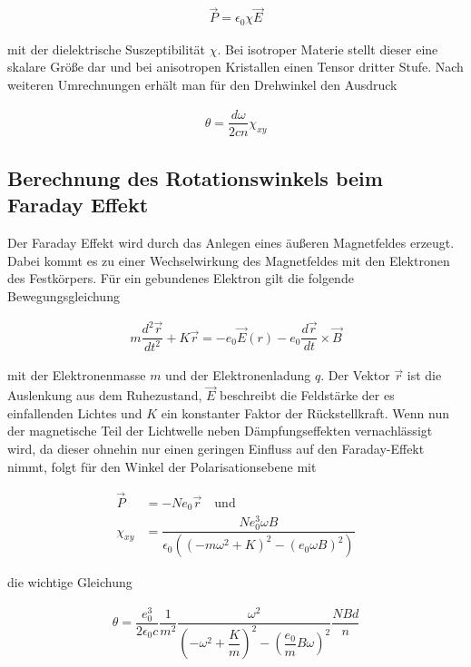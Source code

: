     \begin{align*}
    \vec{P}=\epsilon_0 \chi \vec{E}
    \end{align*}

     mit der dielektrische Suszeptibilität $\chi$. Bei isotroper Materie stellt dieser eine skalare Größe dar und bei anisotropen Kristallen
    einen Tensor dritter Stufe. Nach weiteren Umrechnungen erhält man für den Drehwinkel den Ausdruck

    \begin{align*}
    \theta= \dfrac{d\omega}{2cn}\chi_{xy}
    \end{align*}

    \newpage

    \subsection{Berechnung des Rotationswinkels beim Faraday Effekt}

    Der Faraday Effekt wird durch das Anlegen eines äußeren Magnetfeldes erzeugt.
    Dabei kommt es zu einer Wechselwirkung des Magnetfeldes mit den Elektronen des Festkörpers. Für ein gebundenes Elektron gilt die
    folgende Bewegungsgleichung

    \begin{align*}
    m\dfrac{d^2\vec{r}}{dt^2}+K\vec{r}=-e_0\vec{E}(r)-e_0\dfrac{d\vec{r}}{dt}\times\vec{B}
    \end{align*}

    mit der Elektronenmasse $m$ und der Elektronenladung $q$. Der Vektor $\vec{r}$ ist die Auslenkung aus dem Ruhezustand, $\vec{E}$ beschreibt die Feldstärke der es einfallenden Lichtes und $K$ ein konstanter Faktor der Rückstellkraft.
    Wenn nun der magnetische Teil der Lichtwelle neben Dämpfungseffekten vernachlässigt wird, da dieser ohnehin nur einen geringen Einfluss auf den Faraday-Effekt nimmt, folgt für den Winkel der Polarisationsebene mit
   

    \begin{align*}
    \vec{P}&=-Ne_0\vec{r} \quad \text{und}\\
    \chi_{xy}&=\dfrac{Ne_0^3\omega B}{\epsilon_0\left(\left(-m\omega^2+K\right)^2-\left(e_0\omega B\right)^2\right)}
    \end{align*}

    die wichtige Gleichung

    \begin{align}
    \label{eq:gl11}
    \theta=\dfrac{e_0^3}{2\epsilon_0 c}\dfrac{1}{m^2}\dfrac{\omega^2}{\left(-\omega^2+\dfrac{K}{m}\right)^2 -\left(\dfrac{e_0}{m}B\omega\right)^2}  \dfrac{NBd}{n}
    \end{align}

